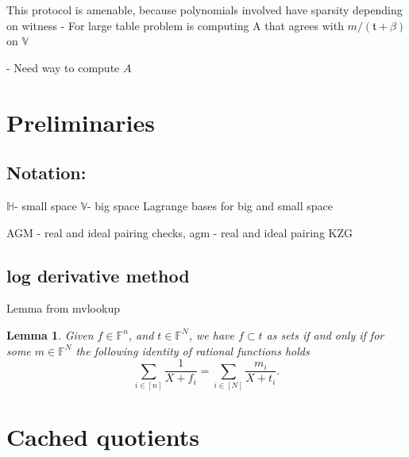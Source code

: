 \documentclass[11pt]{article} %
\newcommand{\F}{\ensuremath{\mathbb F}\xspace}
\newcommand{\sumi}[1]{\sum_{i\in[#1]}}
\newtheorem{lemma}{Lemma}[section]
\newcommand{\subspace}{\ensuremath{\mathbb{H}}\xspace}
\newcommand{\bigspace}{\ensuremath{\mathbb{V}}\xspace}
\newcommand{\witsize}{\ensuremath{n}\xspace}
\newcommand{\tabsize}{\ensuremath{N}\xspace}
\newcommand{\tab}{\ensuremath{\mathfrak{t}}\xspace}
\begin{document}
This protocol is amenable, because polynomials involved have sparsity depending on witness
- For large table problem is computing A that agrees with $m/(\tab+\beta)$ on \bigspace

- Need way to compute $A$ 
\section{Preliminaries}

\subsection{Notation:}
\subspace - small space
\bigspace - big space
Lagrange bases for big and small space




AGM - real and ideal pairing checks,
agm - real and ideal pairing 
KZG

\subsection{log derivative method}
Lemma from mvlookup
\begin{lemma}\label{lem:mvlookup}
 Given $f\in \F^\witsize$, and $t\in \F^\tabsize$,
 we have $f\subset t$ as sets if and only if for some $m\in \F^\tabsize$ the following identity of rational functions holds
 \[\sumi{\witsize}\frac{1}{X+f_i}=\sumi{\tabsize}\frac{m_i}{X+t_i}.\]
\end{lemma}

\section{Cached quotients}
\end{document}
